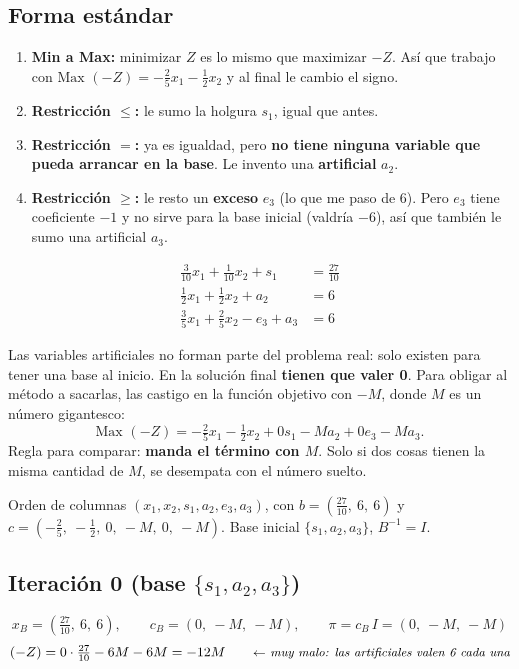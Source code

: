 \documentclass[11pt,a4paper]{article}
\newcommand{\nota}[1]{\qquad\text{\small\color{nota}\itshape$\leftarrow$ #1}}
\newcommand{\Binv}{B^{-1}}
\newcommand{\paso}[1]{\par\medskip\noindent{\color{tinta}\bfseries\large #1}\par\smallskip}
\begin{document}
\subsection*{Forma estándar}
\begin{enumerate}[itemsep=3pt]
  \item \textbf{Min a Max:} minimizar $Z$ es lo mismo que maximizar $-Z$. Así que trabajo con
        $\text{Max } (-Z) = -\tfrac25 x_1 - \tfrac12 x_2$ y al final le cambio el signo.
  \item \textbf{Restricción $\le$:} le sumo la holgura $s_1$, igual que antes.
  \item \textbf{Restricción $=$:} ya es igualdad, pero \textbf{no tiene ninguna variable que pueda arrancar en la base}.
        Le invento una \textbf{artificial} $a_2$.
  \item \textbf{Restricción $\ge$:} le resto un \textbf{exceso} $e_3$ (lo que me paso de 6). Pero $e_3$ tiene coeficiente $-1$
        y no sirve para la base inicial (valdría $-6$), así que también le sumo una artificial $a_3$.
\end{enumerate}
\begin{align*}
\tfrac{3}{10}x_1 + \tfrac1{10}x_2 + s_1 &= \tfrac{27}{10}\\
\tfrac12 x_1 + \tfrac12 x_2 + a_2 &= 6\\
\tfrac35 x_1 + \tfrac25 x_2 - e_3 + a_3 &= 6
\end{align*}

\begin{idea}
Las variables artificiales no forman parte del problema real: solo existen para tener una base al inicio. En la solución final
\textbf{tienen que valer 0}. Para obligar al método a sacarlas, las castigo en la función objetivo con $-M$,
donde $M$ es un número gigantesco:
\[
\text{Max } (-Z) = -\tfrac25 x_1 - \tfrac12 x_2 + 0s_1 - M a_2 + 0e_3 - M a_3.
\]
Regla para comparar: \textbf{manda el término con $M$}. Solo si dos cosas tienen la misma cantidad de $M$,
se desempata con el número suelto.
\end{idea}

Orden de columnas $(x_1, x_2, s_1, a_2, e_3, a_3)$, con $b = \left(\tfrac{27}{10},\ 6,\ 6\right)$ y
$c = \left(-\tfrac25,\ -\tfrac12,\ 0,\ -M,\ 0,\ -M\right)$. Base inicial $\{s_1, a_2, a_3\}$, $\Binv = I$.

\subsection*{Iteración 0 \quad (base $\{s_1, a_2, a_3\}$)}
\paso{1 y 2. Valores y precios duales}
\[
x_B = \left(\tfrac{27}{10},\ 6,\ 6\right), \qquad c_B = (0,\ -M,\ -M), \qquad \pi = c_B\,I = (0,\ -M,\ -M)
\]
\[
(-Z) = 0\cdot\tfrac{27}{10} - 6M - 6M = -12M \nota{muy malo: las artificiales valen 6 cada una}
\]
\end{document}
